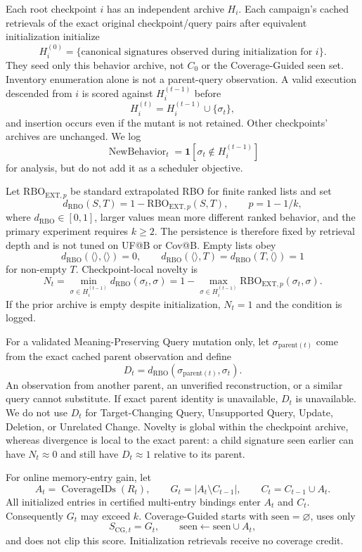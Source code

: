 Each root checkpoint \(i\) has an independent archive \(H_i\). Each campaign's
cached retrievals of the exact original checkpoint/query pairs after equivalent
initialization initialize
\[
H_i^{(0)}=\{\text{canonical signatures observed during initialization for }i\}.
\]
They seed only this behavior archive, not \(C_0\) or the Coverage-Guided seen
set. Inventory enumeration alone is not a parent-query observation. A valid
execution descended from \(i\) is scored against
\(H_i^{(t-1)}\) before
\[
H_i^{(t)}=H_i^{(t-1)}\cup\{\sigma_t\},
\]
and insertion occurs even if the mutant is not retained. Other checkpoints'
archives are unchanged. We log
\[
\operatorname{NewBehavior}_t=
\mathbf{1}[\sigma_t\notin H_i^{(t-1)}]
\]
for analysis, but do not add it as a scheduler objective.

Let \(\mathrm{RBO}_{\mathrm{EXT},p}\) be standard extrapolated RBO for finite
ranked lists and set
\[
d_{\mathrm{RBO}}(S,T)=1-\mathrm{RBO}_{\mathrm{EXT},p}(S,T),
\qquad p=1-1/k,
\]
where \(d_{\mathrm{RBO}}\in[0,1]\), larger values mean more different ranked
behavior, and the primary experiment requires \(k\geq2\). The persistence is
therefore fixed by retrieval depth and is not tuned on UF@B or Cov@B. Empty
lists obey
\[
d_{\mathrm{RBO}}(\langle\rangle,\langle\rangle)=0,
\qquad
d_{\mathrm{RBO}}(\langle\rangle,T)
=d_{\mathrm{RBO}}(T,\langle\rangle)=1
\]
for non-empty \(T\). Checkpoint-local novelty is
\[
N_t=\min_{\sigma\in H_i^{(t-1)}}d_{\mathrm{RBO}}(\sigma_t,\sigma)
=1-\max_{\sigma\in H_i^{(t-1)}}
\mathrm{RBO}_{\mathrm{EXT},p}(\sigma_t,\sigma).
\]
If the prior archive is empty despite initialization, \(N_t=1\) and the
condition is logged.

For a validated Meaning-Preserving Query mutation only, let
\(\sigma_{\mathrm{parent}(t)}\) come from the exact cached parent observation
and define
\[
D_t=d_{\mathrm{RBO}}(\sigma_{\mathrm{parent}(t)},\sigma_t).
\]
An observation from another parent, an unverified reconstruction, or a similar
query cannot substitute. If exact parent identity is unavailable, \(D_t\) is
unavailable. We do not use \(D_t\) for Target-Changing Query, Unsupported
Query, Update, Deletion, or Unrelated Change. Novelty is global within the
checkpoint archive, whereas divergence is local to the exact parent: a child
signature seen earlier can have \(N_t\approx0\) and still have
\(D_t\approx1\) relative to its parent.

For online memory-entry gain, let
\[
A_t=\operatorname{CoverageIDs}(R_t),\qquad
G_t=|A_t\setminus C_{t-1}|,
\qquad C_t=C_{t-1}\cup A_t.
\]
All initialized entries in certified multi-entry bindings enter \(A_t\) and
\(C_t\). Consequently \(G_t\) may exceed \(k\). Coverage-Guided starts with
\(\mathrm{seen}=\varnothing\), uses only
\[
S_{\mathrm{CG},t}=G_t,
\qquad \mathrm{seen}\leftarrow\mathrm{seen}\cup A_t,
\]
and does not clip this score. Initialization retrievals receive no coverage
credit.

